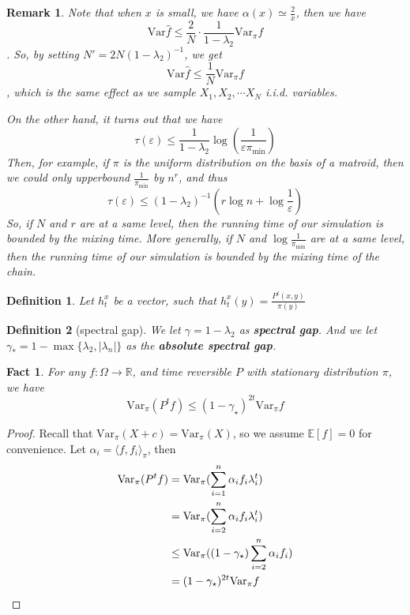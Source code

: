\documentclass{article}
\newtheorem{define}{Definition}[section]
\newtheorem{fact}{Fact}[section]
\newtheorem{remark}{Remark}[section]
\def\<{\langle}
\def\>{\rangle}
\begin{document}
\begin{remark}
  Note that when $x$ is small, we have $\alpha(x) \simeq \frac{2}{x}$, then we have
  \[\mathrm{Var}\hat{f} \leq \frac{2}{N}\cdot \frac{1}{1 - \lambda_2} \mathrm{Var}_\pi f\].
  So, by setting $N' = 2N (1 - \lambda_2)^{-1}$, we get
  \[\mathrm{Var} \hat{f} \leq \frac{1}{N} \mathrm{Var}_\pi f\]
  , which is the same effect as we sample $X_1, X_2, \cdots X_N$ i.i.d. variables.

  On the other hand, it turns out that we have
  \[\tau(\varepsilon) \leq \frac{1}{1 - \lambda_2} \log \left(\frac{1}{\varepsilon \pi_{\min}}\right)\]
  Then, for example, if $\pi$ is the uniform distribution on the basis of a matroid, then we could only
  upperbound $\frac{1}{\pi_{\min}}$ by $n^r$, and thus
  \[\tau(\varepsilon) \leq (1-\lambda_2)^{-1}(r\log n + \log \frac{1}{\varepsilon})\]
  So, if $N$ and $r$ are at a same level, then the running time of our simulation is bounded by the mixing time.
  More generally, if $N$ and $\log \frac{1}{\pi_{\min}}$ are at a same level, then the running time of our simulation is bounded by the mixing time of the chain.
\end{remark}

\begin{define}
  Let $h_t^x$ be a vector, such that $h_t^x(y) = \frac{P^t(x,y)}{\pi(y)}$
\end{define}

\begin{define}[spectral gap]
  We let $\gamma = 1 - \lambda_2$ as \textbf{spectral gap}.
  And we let $\gamma_* = 1 - \max\{\lambda_2, |\lambda_n|\}$ as the \textbf{absolute spectral gap}.
\end{define}

\begin{fact} \label{fact:var-decay}
  For any $f: \Omega\to \mathbb{R}$, and time reversible $P$ with stationary distribution $\pi$, we have
  \[\mathrm{Var}_\pi (P^tf) \leq (1 - \gamma_\star)^{2t} \mathrm{Var}_\pi f\]
\end{fact}
\begin{proof}
  Recall that $\mathrm{Var}_\pi (X + c) = \mathrm{Var}_\pi(X)$, so we assume $\mathbb{E}[f] = 0$ for convenience.
  Let $\alpha_i = \<f, f_i\>_\pi$, then
  \begin{align*}
    \mathrm{Var}_\pi(P^tf)
    &= \mathrm{Var}_\pi (\sum_{i=1}^n \alpha_i f_i \lambda_i^t) \\
    &= \mathrm{Var}_\pi (\sum_{i=2}^n \alpha_i f_i \lambda_i^t) \\
    &\leq \mathrm{Var}_\pi ((1 - \gamma_\star) \sum_{i=2}^n \alpha_i f_i) \\
    &= (1 - \gamma_\star)^{2t} \mathrm{Var}_\pi f \qedhere
  \end{align*}
\end{proof}
\end{document}
